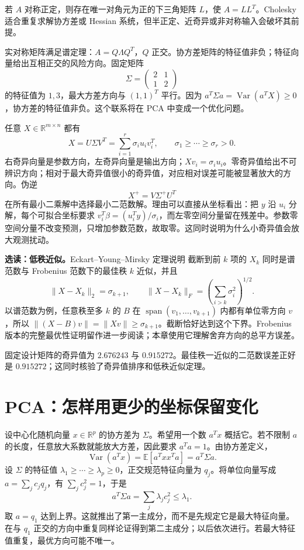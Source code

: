 
若 $A$ 对称正定，则存在唯一对角元为正的下三角矩阵 $L$，使 $A=LL^T$。Cholesky 适合重复求解协方差或 Hessian 系统，但半正定、近奇异或非对称输入会破坏其前提。

实对称矩阵满足谱定理：$A=Q\Lambda Q^T$，$Q$ 正交。协方差矩阵的特征值非负；特征向量给出互相正交的风险方向。固定矩阵
\[
  \Sigma=\begin{pmatrix}2&1\\1&2\end{pmatrix}
\]
的特征值为 $1,3$，最大方差方向与 $(1,1)^T$ 平行。因为 $a^T\Sigma a=\operatorname{Var}(a^TX)\ge0$，协方差的特征值非负。这个联系将在 PCA 中变成一个优化问题。


任意 $X\in\mathbb R^{m\times n}$ 都有
\[
 X=U\Sigma V^T=\sum_{i=1}^{r}\sigma_i u_iv_i^T,
 \qquad \sigma_1\ge\cdots\ge\sigma_r>0.
\]
右奇异向量是参数方向，左奇异向量是输出方向；$Xv_i=\sigma_i u_i$。零奇异值给出不可辨识方向；相对于最大奇异值很小的奇异值，对应相对误差可能被显著放大的方向。伪逆
\[
 X^+=V\Sigma^+U^T
\]
在所有最小二乘解中选择最小二范数解。理由可以直接从坐标看出：把 $y$ 沿 $u_i$ 分解，每个可拟合坐标要求 $v_i^T\beta=(u_i^Ty)/\sigma_i$，而左零空间分量留在残差中。参数零空间分量不改变预测，只增加参数范数，故取零。这同时说明为什么小奇异值会放大观测扰动。

\textbf{选读：低秩近似。}Eckart--Young--Mirsky 定理说明
截断到前 $k$ 项的 $X_k$ 同时是谱范数与 Frobenius 范数下的最佳秩
$k$ 近似，并且
\[
 \lVert X-X_k\rVert_2=\sigma_{k+1},\qquad
 \lVert X-X_k\rVert_F=\left(\sum_{i>k}\sigma_i^2\right)^{1/2}.
\]
以谱范数为例，任意秩至多 $k$ 的 $B$ 在 $\operatorname{span}(v_1,\ldots,v_{k+1})$ 内都有单位零方向 $v$，所以 $\|(X-B)v\|=\|Xv\|\ge\sigma_{k+1}$。截断恰好达到这个下界。Frobenius 版本的完整最优性证明留作进一步阅读；本章使用它理解舍弃方向的总平方误差。

固定设计矩阵的奇异值为 $2.676243$ 与 $0.915272$。最佳秩一近似的二范数误差正好是 $0.915272$；这同时核验了奇异值排序和低秩近似定理。

\section{PCA：怎样用更少的坐标保留变化}

设中心化随机向量 $x\in\mathbb R^p$ 的协方差为 $\Sigma$。希望用一个数 $a^Tx$ 概括它。若不限制 $a$ 的长度，任意放大系数就能放大方差，因此要求 $a^Ta=1$。由协方差定义，
\[
\operatorname{Var}(a^Tx)=\mathbb E[a^Txx^Ta]=a^T\Sigma a.
\]
设 $\Sigma$ 的特征值 $\lambda_1\ge\cdots\ge\lambda_p\ge0$，正交规范特征向量为 $q_j$。将单位向量写成 $a=\sum_jc_jq_j$，有 $\sum_jc_j^2=1$，于是
\[
a^T\Sigma a=\sum_j\lambda_jc_j^2\le\lambda_1.
\]
取 $a=q_1$ 达到上界。这就推出了第一主成分，而不是先规定它是最大特征向量。在与 $q_1$ 正交的方向中重复同样论证得到第二主成分；以后依次进行。若最大特征值重复，最优方向可能不唯一。

